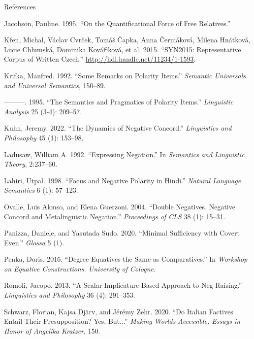 \documentclass[
  ignorenonframetext,
]{beamer}
\newlength{\cslhangindent}
\newlength{\cslentryspacingunit} %
\newenvironment{CSLReferences}[2] %
 {%
  \setlength{\parindent}{0pt}
  \ifodd #1
  \let\oldpar\par
  \def\par{\hangindent=\cslhangindent\oldpar}
  \fi
  \setlength{\parskip}{#2\cslentryspacingunit}
 }%
 {}
\begin{document}
\begin{frame}{References}
\begin{CSLReferences}{1}{0}
\leavevmode{}%
Jacobson, Pauline. 1995. {``On the Quantificational Force of Free
Relatives.''}

\leavevmode{}%
Křen, Michal, Václav Cvrček, Tomáš Čapka, Anna Čermáková, Milena
Hnátková, Lucie Chlumská, Dominika Kovářı́ková, et al. 2015.
{``{SYN2015}: Representative Corpus of Written Czech.''}
\url{http://hdl.handle.net/11234/1-1593}.

\leavevmode{}%
Krifka, Manfred. 1992. {``Some Remarks on Polarity Items.''}
\emph{Semantic Universals and Universal Semantics}, 150--89.

\leavevmode{}%
---------. 1995. {``The Semantics and Pragmatics of Polarity Items.''}
\emph{Linguistic Analysis} 25 (3-4): 209--57.

\leavevmode{}%
Kuhn, Jeremy. 2022. {``The Dynamics of Negative Concord.''}
\emph{Linguistics and Philosophy} 45 (1): 153--98.

\leavevmode{}%
Ladusaw, William A. 1992. {``Expressing Negation.''} In \emph{Semantics
and Linguistic Theory}, 2:237--60.

\leavevmode{}%
Lahiri, Utpal. 1998. {``Focus and Negative Polarity in Hindi.''}
\emph{Natural Language Semantics} 6 (1): 57--123.

\leavevmode{}%
Ovalle, Luis Alonso, and Elena Guerzoni. 2004. {``Double Negatives,
Negative Concord and Metalinguistic Negation.''} \emph{Proceedings of
CLS} 38 (1): 15--31.

\leavevmode{}%
Panizza, Daniele, and Yasutada Sudo. 2020. {``Minimal Sufficiency with
Covert Even.''} \emph{Glossa} 5 (1).

\leavevmode{}%
Penka, Doris. 2016. {``Degree Equatives-the Same as Comparatives.''} In
\emph{Workshop on Equative Constructions. University of Cologne}.

\leavevmode{}%
Romoli, Jacopo. 2013. {``A Scalar Implicature-Based Approach to
Neg-Raising.''} \emph{Linguistics and Philosophy} 36 (4): 291--353.

\leavevmode{}%
Schwarz, Florian, Kajsa Djärv, and Jérémy Zehr. 2020. {``Do Italian
Factives Entail Their Presupposition? Yes, But...''} \emph{Making Worlds
Accessible. Essays in Honor of Angelika Kratzer}, 150.


\end{CSLReferences}
\end{frame}
\end{document}
